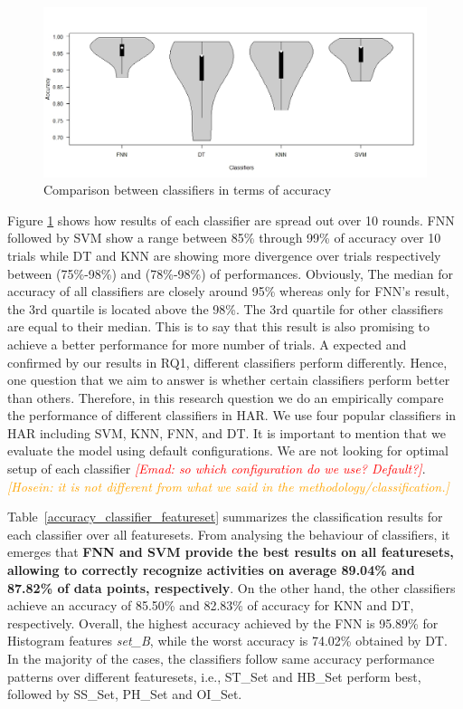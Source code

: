 \documentclass[journal,article,submit,moreauthors,pdftex]{Definitions/mdpi}
\newcommand{\emad}[1]{\textcolor{red}{{\it [Emad: #1]}}}
\newcommand{\hosein}[1]{\textcolor{orange}{{\it [Hosein: #1]}}}
\begin{document}
\begin{figure}[H]
	\centering
	\includegraphics[width=14 cm]{Definitions/images/boxplot_overall_accuracy_4.jpeg}
	\caption{Comparison between classifiers in terms of accuracy}
	\label{fig:classification_comparison}
\end{figure}
 Figure \ref{fig:classification_comparison} shows how results of each classifier are spread out over 10 rounds. FNN followed by SVM show a range between 85\% through 99\% of accuracy over 10 trials while DT and KNN are showing more divergence over trials respectively between (75\%-98\%) and (78\%-98\%) of performances. Obviously, The median for accuracy of all classifiers are closely around 95\% whereas only for FNN's result, the 3rd quartile is located above the 98\%. The 3rd quartile for other classifiers are equal to their median. This is to say that this result is also promising to achieve a better performance for more number of trials.
A expected and confirmed by our results in RQ1, different classifiers perform differently. Hence, one question that we aim to answer is whether certain classifiers perform better than others. Therefore, in this research question we do an empirically compare the performance of different classifiers in HAR. We use four popular classifiers in HAR including SVM, KNN, FNN, and DT. It is important to mention that we evaluate the model using default configurations. We are not looking for optimal setup of each classifier \emad{so which configuration do we use? Default?}. \hosein{it is not different from what we said in the methodology/classification.}

Table~\ref{accuracy_classifier_featureset} summarizes the classification results for each classifier over all featuresets.  From analysing the behaviour of classifiers, it emerges that \textbf{FNN and SVM provide the best results on all featuresets, allowing to correctly recognize activities on average 89.04\% and 87.82\% of data points, respectively}. On the other hand, the other classifiers achieve an accuracy of 85.50\% and 82.83\% of accuracy for KNN and DT, respectively. Overall, the highest accuracy achieved by the FNN is 95.89\% for Histogram features \textit{set\_B}, while the worst accuracy is 74.02\% obtained by DT. In the majority of the cases, the classifiers follow same accuracy performance patterns over different featuresets, i.e., ST\_Set and HB\_Set perform best, followed by SS\_Set, PH\_Set and OI\_Set. 
\end{document}
